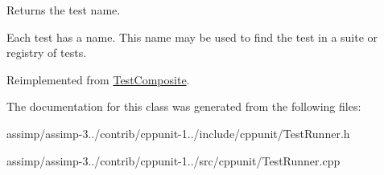 Returns the test name. 

Each test has a name. This name may be used to find the test in a suite or registry of tests. 

Reimplemented from \hyperlink{class_test_composite_addf2aec7ab7233e433cb5bdf98defb61}{Test\+Composite}.



The documentation for this class was generated from the following files\+:\begin{DoxyCompactItemize}
\item 
assimp/assimp-\/3../contrib/cppunit-\/1../include/cppunit/Test\+Runner.\+h\item 
assimp/assimp-\/3../contrib/cppunit-\/1../src/cppunit/Test\+Runner.\+cpp\end{DoxyCompactItemize}
